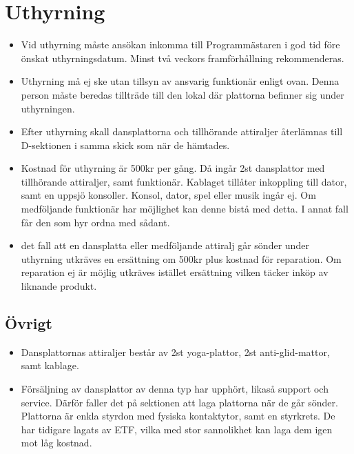 \documentclass{dsekprotokoll}
\begin{document}
\section{Uthyrning}
\begin{itemize}
    \item Vid uthyrning måste ansökan inkomma till Programmästaren i god tid före önskat uthyrningsdatum. Minst två veckors framförhållning rekommenderas.
    \item Uthyrning må ej ske utan tillsyn av ansvarig funktionär enligt ovan. Denna person måste beredas tillträde till den lokal där plattorna befinner sig under uthyrningen.
    \item Efter uthyrning skall dansplattorna och tillhörande attiraljer återlämnas till D-sektionen i samma skick som när de hämtades.
    \item Kostnad för uthyrning är 500kr per gång. Då ingår 2st dansplattor med tillhörande attiraljer, samt funktionär. Kablaget tillåter inkoppling till dator, samt en uppsjö konsoller. Konsol, dator, spel eller musik ingår ej. Om medföljande funktionär har möjlighet kan denne bistå med detta. I annat fall får den som hyr ordna med sådant.
    \item det fall att en dansplatta eller medföljande attiralj går sönder under uthyrning utkräves en ersättning om 500kr plus kostnad för reparation. Om reparation ej är möjlig utkräves istället ersättning vilken täcker inköp av liknande produkt.
\end{itemize}


\subsection{Övrigt}
\begin{itemize}
    \item Dansplattornas attiraljer består av 2st yoga-plattor, 2st anti-glid-mattor, samt kablage.
    \item Försäljning av dansplattor av denna typ har upphört, likaså support och service. Därför faller det på sektionen att laga plattorna när de går sönder. Plattorna är enkla styrdon med fysiska kontaktytor, samt en styrkrets. De har tidigare lagats av ETF, vilka med stor sannolikhet kan laga dem igen mot låg kostnad.
\end{itemize}
\end{document}
